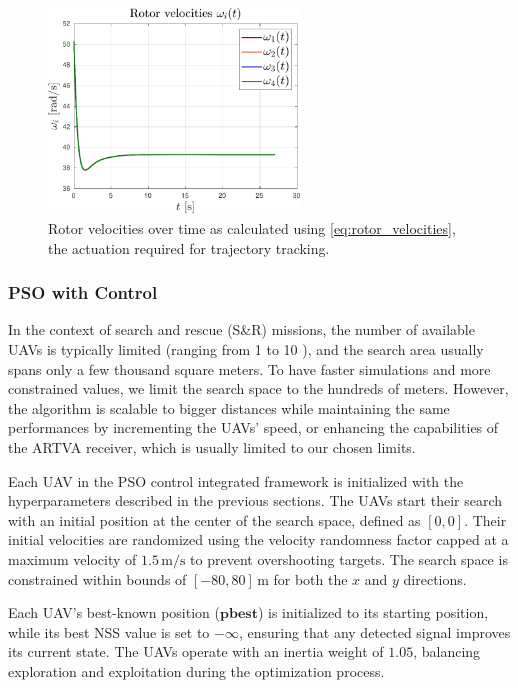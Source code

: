\documentclass[main]{subfiles}
\begin{document}
\begin{figure}
    \centering
    \includegraphics[width=0.6\textwidth]{images/rotor_velocities.pdf}
    \caption[Rotor Velocities]{Rotor velocities over time as calculated using \eqref{eq:rotor_velocities}, the actuation required for trajectory tracking.}
    \label{fig:rotor_velocities}
\end{figure}

\newpage
\subsubsection{PSO with Control}
In the context of search and rescue (S\&R) missions, the number of available 
UAVs is typically limited (ranging from 1 to 10 \cite{PSO_original}), and 
the search area 
usually spans only a few thousand square meters.
To have faster simulations and more constrained 
values, we limit the search space 
to the hundreds of meters.
However, the algorithm is scalable to bigger distances while maintaining the same
performances by incrementing the UAVs' speed, or enhancing the capabilities
of the ARTVA receiver, which is usually limited to our chosen limits.

Each UAV in the PSO control integrated framework is 
initialized with the hyperparameters described in the previous sections. 
The UAVs start their search with an initial position at the 
center of the search space, defined as \([0, 0]\). 
Their initial velocities are randomized using the velocity randomness
factor capped at a maximum velocity of \(1.5 \, \text{m/s}\) 
to prevent overshooting targets. The search space is constrained within bounds 
of \([-80, 80] \, \text{m}\) for both the \(x\) and \(y\) directions.

Each UAV's best-known position ($\mathbf{pbest}$) is initialized 
to its starting position, while its best NSS
value is set to \(-\infty\), ensuring that any detected signal improves 
its current state. The UAVs operate with an inertia weight of \(1.05\), 
balancing exploration and exploitation during the optimization process. 
\end{document}
